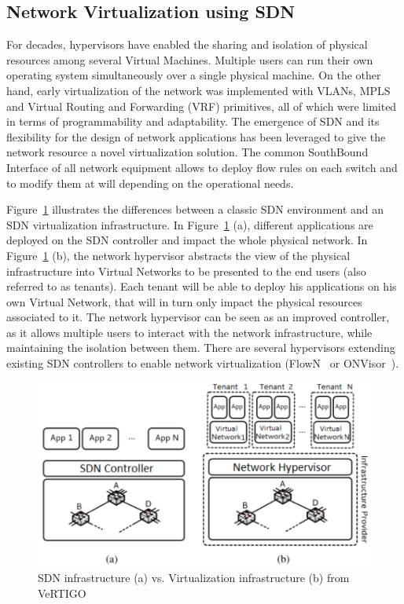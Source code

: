 \subsection{Network Virtualization using SDN}
\label{def:netvirt}

For decades, hypervisors have enabled the sharing and isolation of physical resources among several Virtual Machines.
Multiple users can run their own operating system simultaneously over a single physical machine.
On the other hand, early virtualization of the network was implemented with VLANs, MPLS and Virtual Routing and Forwarding (VRF) primitives, all of which were limited in terms of programmability and adaptability. The emergence of SDN and its flexibility for the design of network applications has been leveraged to give the network resource a novel virtualization solution. The common SouthBound Interface of all network equipment allows to deploy flow rules on each switch and to modify them at will depending on the operational needs.

Figure~\ref{fig:virt-archi} illustrates the differences between a classic SDN environment and an SDN virtualization infrastructure. In Figure~\ref{fig:virt-archi} (a), different applications are deployed on the SDN controller and impact the whole physical network.
In Figure~\ref{fig:virt-archi} (b), the network hypervisor abstracts the view of the physical infrastructure into Virtual Networks to be presented to the end users (also referred to as tenants).
Each tenant will be able to deploy his applications on his own Virtual Network, that will in turn only impact the physical resources associated to it.
The network hypervisor can be seen as an improved controller, as it allows multiple users to interact with the network infrastructure, while maintaining the isolation between them.
There are several hypervisors extending existing SDN controllers to enable network virtualization (\eg FlowN~\cite{FlowN-Drutskoy2012} or ONVisor~\cite{ONVisor-Han2018}).

\begin{figure}[ht]
    \centering
    \includegraphics[scale=0.9]{figures/virt-archi.pdf}
    \caption{SDN infrastructure (a) vs. Virtualization infrastructure (b) from VeRTIGO~\cite{VeRTIGO-Corin2012a}}
    \label{fig:virt-archi}
\end{figure}


